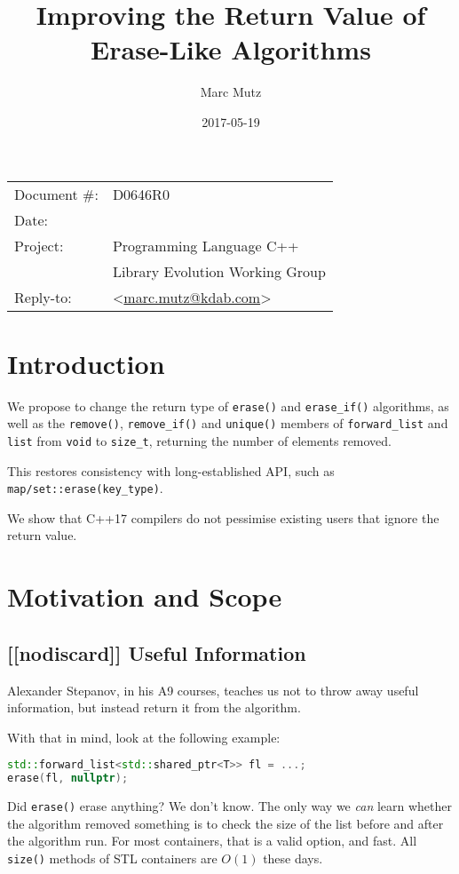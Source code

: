 \documentclass[11pt]{article}
\date{}
\title{Improving the Return Value of Erase-Like Algorithms}
\makeatletter
\newcommand{\emailaddress}{marc.mutz@kdab.com}
\newcommand{\email}{\href{mailto:\emailaddress}{\emailaddress}}
\makeatother
\begin{document}
\maketitle\vspace{-2cm}

\begin{flushright}
  \begin{tabular}{ll}
  Document \#:&D0646R0\\
  Date:       &\date{2017-05-19}\\
  Project:    &Programming Language C++\\
              &Library Evolution Working Group\\
  Reply-to:   &\author{Marc Mutz} \textless\email\textgreater
  \end{tabular}
\end{flushright}

\section{Introduction}

We propose to change the return type of \cite{LFv2TS} \texttt{erase()}
and \texttt{erase\_if()} algorithms, as well as the \texttt{remove()},
\texttt{remove\_if()} and \texttt{unique()} members of
\texttt{forward\_list} and \texttt{list} from \texttt{void} to
\texttt{size\_t}, returning the number of elements removed.

This restores consistency with long-established API, such as
\texttt{map/set::erase(key\_type)}.

We show that C++17 compilers do not pessimise existing users that
ignore the return value.

\section{Motivation and Scope}

\subsection{[[nodiscard]] Useful Information}

Alexander Stepanov, in his A9 courses\cite{A9}, teaches us not to
throw away useful information, but instead return it from the
algorithm.

With that in mind, look at the following example:
\begin{lstlisting}[language=C++]
std::forward_list<std::shared_ptr<T>> fl = ...;
erase(fl, nullptr);
\end{lstlisting}
Did \texttt{erase()} erase anything? We don't know. The only way we
\emph{can} learn whether the algorithm removed something is to check
the size of the list before and after the algorithm run. For most
containers, that is a valid option, and fast. All \texttt{size()}
methods of STL containers are $O(1)$ these days.
\end{document}
